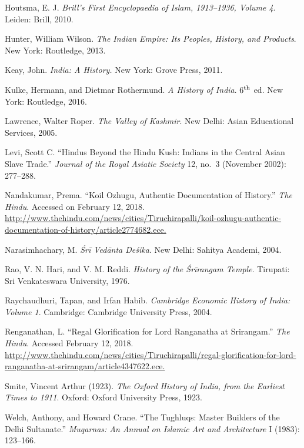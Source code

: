 \begin{thebibliography}{99}
 Houtsma, E. J. \textit{Brill's First Encyclopaedia of Islam, 1913--1936, Volume 4}. Leiden: Brill, 2010.

 Hunter, William Wilson. \textit{The Indian Empire: Its Peoples, History, and Products}. New York: Routledge, 2013.

 Keay, John. \textit{India: A History.} New York: Grove Press, 2011. 

 Kulke, Hermann, and Dietmar Rothermund. \textit{A History of India}. $6^{\rm th}$ ed. New York: Routledge, 2016.

 Lawrence, Walter Roper. \textit{The Valley of Kashmir}. New Delhi: Asian Educational Services, 2005. 

 Levi, Scott C. “Hindus Beyond the Hindu Kush: Indians in the Central Asian Slave Trade.” \textit{Journal of the Royal Asiatic Society} 12, no.\ 3 (November 2002): 277--288.

 Nandakumar, Prema.  “Koil Ozhugu, Authentic Documentation of History.” \textit{The Hindu}.  Accessed on February 12, 2018. \url{http://www.thehindu.com/news/cities/Tiruchirapalli/koil-ozhugu-authentic-documentation-of-history/article2774682.ece.}

 Narasimhachary, M. \textit{ Śrī Vedānta Deśika}. New Delhi: Sahitya Academi, 2004. 

 Rao, V. N. Hari, and V. M. Reddi. \textit{ History of the Śrīrangam Temple}. Tirupati: Sri Venkateswara University, 1976. 

 Raychaudhuri, Tapan, and Irfan Habib. \textit{Cambridge Economic History of India: Volume 1}. Cambridge: Cambridge University Press, 2004.  

 Renganathan, L. “Regal Glorification for Lord Ranganatha at Srirangam.” \textit{ The Hindu}. Accessed February 12, 2018.  \url{http://www.thehindu.com/news/cities/Tiruchirapalli/regal-glorification-for-lord-ranganatha-at-srirangam/article4347622.ece.} 

 Smite, Vincent Arthur (1923). \textit{The Oxford History of India, from the Earliest Times to 1911}. Oxford: Oxford University Press, 1923. 

 Welch, Anthony, and Howard Crane. “The Tughluqs: Master Builders of the Delhi Sultanate.” \textit{Muqarnas: An Annual on Islamic Art and Architecture}  I (1983): 123--166.
\end{thebibliography}

